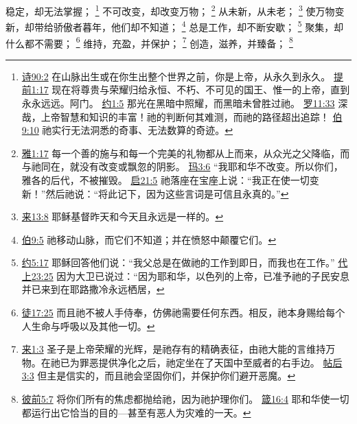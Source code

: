 \documentclass[12pt, a4paper, oneside]{ctexart}
\begin{document}
    稳定，却无法掌握；
    \footnote {
        \href{https://biblehub.com/psalms/90-2.htm}{诗90:2} 在山脉出生或在你生出整个世界之前，你是上帝，从永久到永久。
		\href{https://biblehub.com/1_timothy/1-17.htm}{提前1:17} 现在将尊贵与荣耀归给永恒、不朽、不可见的国王、惟一的上帝，直到永永远远。阿门。
        \href{https://biblehub.com/john/1-5.htm}{约1:5} 那光在黑暗中照耀，而黑暗未曾胜过祂。
		\href{https://biblehub.com/romans/11-33.htm}{罗11:33} 深哉，上帝智慧和知识的丰富！祂的判断何其难测，而祂的路径超出追踪！
        \href{https://biblehub.com/job/9-10.htm}{伯9:10} 祂实行无法洞悉的奇事、无法数算的奇迹。
	}
    不可改变，却改变万物；
    \footnote {
        \href{https://biblehub.com/james/1-17.htm}{雅1:17} 每一个善的施与和每一个完美的礼物都从上而来，从众光之父降临，而与祂同在，就没有改变或飘忽的阴影。
		\href{https://biblehub.com/malachi/3-6.htm}{玛3:6} “我耶和华不改变。所以你们，雅各的后代，不被摧毁。
        \href{https://biblehub.com/revelation/21-5.htm}{启21:5} 祂落座在宝座上说：“我正在使一切变新！”然后祂说：“将此记下，因为这些言词是可信且永真的。”
	}
    从未新，从未老；
    \footnote {
        \href{https://biblehub.com/hebrews/13-8.htm}{来13:8} 耶稣基督昨天和今天且永远是一样的。
	}
    使万物变新，却带给骄傲者暮年，他们却不知道；
    \footnote {
        \href{https://biblehub.com/jobs/9-5.htm}{伯9:5} 祂移动山脉，而它们不知道；并在愤怒中颠覆它们。
	}
    总是工作，却不断安歇；
    \footnote {
        \href{https://biblehub.com/john/5-17.htm}{约5:17} 耶稣回答他们说：“我父总是在做祂的工作到即日，而我也在工作。”
        \href{https://biblehub.com/1_chronicles/23-25.htm}{代上23:25} 因为大卫已说过：“因为耶和华，以色列的上帝，已准予祂的子民安息并已来到在耶路撒冷永远栖居，
	}
    聚集，却什么都不需要；
	\footnote {
        \href{https://biblehub.com/acts/17-25.htm}{徒17:25} 而且祂不被人手侍奉，仿佛祂需要任何东西。相反，祂本身赐给每个人生命与呼吸以及其他一切。
	}
	维持，充盈，并保护；
    \footnote {
        \href{https://biblehub.com/hebrews/1-3.htm}{来1:3} 圣子是上帝荣耀的光辉，是祂存有的精确表征，由祂大能的言维持万物。在祂已为罪恶提供净化之后，祂定坐在了天国中至威者的右手边。
        \href{https://biblehub.com/2_thessalonians/3-3.htm}{帖后3:3} 但主是信实的，而且祂会坚固你们，并保护你们避开恶魔。
	}
    创造，滋养，并臻备；
    \footnote {
        \href{https://biblehub.com/1_peter/5-7.htm}{彼前5:7} 将你们所有的焦虑都抛给祂，因为祂护理你们。
        \href{https://biblehub.com/proverbs/16-4.htm}{箴16:4} 耶和华使一切都运行出它恰当的目的---甚至有恶人为灾难的一天。
	}
\end{document}
